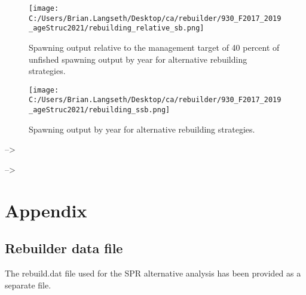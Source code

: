 \documentclass[11pt,
  english,
  a4paper,
]{article}
\begin{document}
\tagmcend\tagstructend


\begin{figure}
\centering
\texttt{[image: C:/Users/Brian.Langseth/Desktop/ca/rebuilder/930\_F2017\_2019\_ageStruc2021/rebuilding\_relative\_sb.png]}
\caption{Spawning output relative to the management target of 40 percent of unfished spawning output by year for alternative rebuilding strategies.\label{fig:rel-ssb-fig}}
\end{figure}

\tagmcend\tagstructend


\begin{figure}
\centering
\texttt{[image: C:/Users/Brian.Langseth/Desktop/ca/rebuilder/930\_F2017\_2019\_ageStruc2021/rebuilding\_ssb.png]}
\caption{Spawning output by year for alternative rebuilding strategies.\label{fig:rel-ssb-fig}}
\end{figure}

\tagmcend\tagstructend


--\textgreater{}

\leavevmode\tagmcend\tagstructend\par


--\textgreater{}

\leavevmode\tagmcend\tagstructend\par

\clearpage


\hypertarget{appendix}{%
\section{Appendix}\label{appendix}}

\leavevmode\tagmcend\tagstructend


\hypertarget{append_a}{%
\subsection{Rebuilder data file}\label{append_a}}

\leavevmode\tagmcend\tagstructend


The rebuild.dat file used for the SPR alternative analysis has been provided as a separate file.

\leavevmode\tagmcend\tagstructend\par
\end{document}
